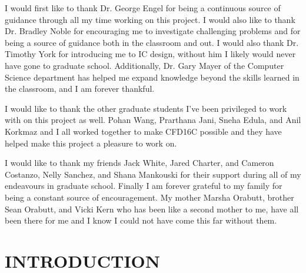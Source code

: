 \documentclass[12pt,oneside,final]{siuethesis}
\theoremstyle{definition}
\begin{document}
\begin{acknowledgements}

\par I would first like to thank Dr. George Engel for being a continuous source of guidance through all my time working on this project. I would also like to thank Dr. Bradley Noble for encouraging me to investigate challenging problems and for being a source of guidance both in the classroom and out. I would also thank Dr. Timothy York for introducing me to IC design, without him I likely would never have gone to graduate school. Additionally, Dr. Gary Mayer of the Computer Science department has helped me expand knowledge beyond the skills learned in the classroom, and I am forever thankful.
\par I would like to thank the other graduate students I've been privileged to work with on this project as well. Pohan Wang, Prarthana Jani, Sneha Edula, and Anil Korkmaz and I all worked together to make CFD16C possible and they have helped make this project a pleasure to work on.
\par I would like to thank my friends Jack White, Jared Charter, and Cameron Costanzo, Nelly Sanchez, and Shana Mankouski for their support during all of my endeavours in graduate school. Finally I am forever grateful to my family for being a constant source of encouragement. My mother Marsha Orabutt, brother Sean Orabutt, and Vicki Kern who has been like a second mother to me, have all been there for me and I know I could not have come this far without them.

\end{acknowledgements}

\tableofcontents

\cleardoublepage %

\listoffigures %

\cleardoublepage

\listoftables

\mainmatter %


\chapter{INTRODUCTION}  %
\end{document}
